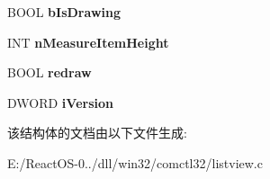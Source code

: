 \begin{DoxyCompactItemize}
\item 
\mbox{\label{structtag_l_i_s_t_v_i_e_w___i_n_f_o_abecc27d4cf58062de5896283aacfa258}} 
B\+O\+OL {\bfseries b\+Is\+Drawing}
\item 
\mbox{\label{structtag_l_i_s_t_v_i_e_w___i_n_f_o_a93ce0a6fdef0822dfa816d6f5a50cf64}} 
I\+NT {\bfseries n\+Measure\+Item\+Height}
\item 
\mbox{\label{structtag_l_i_s_t_v_i_e_w___i_n_f_o_a55bfd00f81b949bc2603e858bccae860}} 
B\+O\+OL {\bfseries redraw}
\item 
\mbox{\label{structtag_l_i_s_t_v_i_e_w___i_n_f_o_af45088325ec96750cd8222facbf20517}} 
D\+W\+O\+RD {\bfseries i\+Version}
\end{DoxyCompactItemize}


该结构体的文档由以下文件生成\+:\begin{DoxyCompactItemize}
\item 
E\+:/\+React\+O\+S-\/0../dll/win32/comctl32/listview.\+c\end{DoxyCompactItemize}
